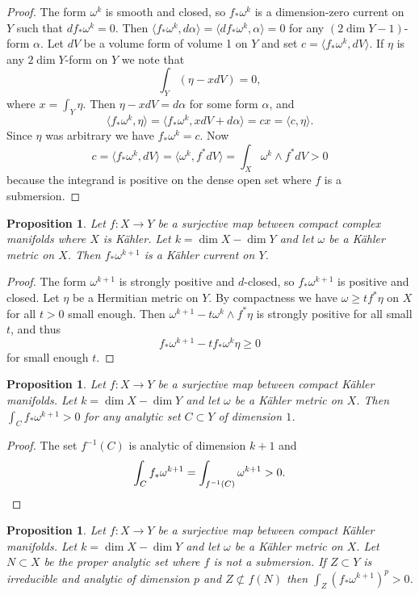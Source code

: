 \documentclass[11pt]{amsart}
\newtheorem{prop}[theo]{Proposition}
\theoremstyle{definition}
\def\<{\langle}
\def\>{\rangle}
\begin{document}
\begin{proof}
The form $\omega^k$ is smooth and closed, so $f_*\omega^k$ is a dimension-zero current on $Y$ such that $d f_*\omega^k = 0$.
Then $\< f_*\omega^k, d\alpha \> = \< df_*\omega^k, \alpha \> = 0$ for any $(2\dim Y-1)$-form $\alpha$.
Let $dV$ be a volume form of volume 1 on $Y$ and set $c = \< f_*\omega^k ,dV\>$.
If $\eta$ is any $2\dim Y$-form on $Y$ we note that
\[
\int_Y (\eta - x dV) = 0,
\]
where $x = \int_Y \eta$.
Then $\eta - x dV = d\alpha$ for some form $\alpha$, and
\[
\< f_*\omega^k, \eta \>
= \< f_*\omega^k, x dV + d\alpha \>
= cx
= \< c, \eta \>.
\]
Since $\eta$ was arbitrary we have $f_*\omega^k = c$.
Now
\[
c = \< f_*\omega^k, dV \>
= \< \omega^k, f^*dV \>
= \int_X \omega^k \wedge f^*dV 
> 0
\]
because the integrand is positive on the dense open set where $f$ is a submersion.
\end{proof}


\begin{prop}
Let $f : X \to Y$ be a surjective map between compact complex manifolds where $X$ is K\"ahler.
Let $k = \dim X - \dim Y$ and let $\omega$ be a K\"ahler metric on $X$.
Then $f_*\omega^{k+1}$ is a K\"ahler current on $Y$.
\end{prop}

\begin{proof}
The form $\omega^{k+1}$ is strongly positive and $d$-closed, so $f_*\omega^{k+1}$ is positive and closed.
Let $\eta$ be a Hermitian metric on $Y$.
By compactness we have $\omega \geq t f^*\eta$ on $X$ for all $t > 0$ small enough.
Then $\omega^{k+1} - t \omega^k \wedge f^*\eta$ is strongly positive for all small $t$, and thus
\[
f_*\omega^{k+1} - t f_*\omega^k \eta \geq 0
\]
for small enough $t$.
\end{proof}



\begin{prop}
Let $f : X \to Y$ be a surjective map between compact K\"ahler manifolds.
Let $k = \dim X - \dim Y$ and let $\omega$ be a K\"ahler metric on $X$.
Then $\int_C f_*\omega^{k+1} > 0$ for any analytic set $C \subset Y$ of dimension $1$.
\end{prop}

\begin{proof}
The set $f^{-1}(C)$ is analytic of dimension $k+1$ and
\[
\int_C f_*\omega^{k+1}
= \int_{f^{-1}(C)} \omega^{k+1} > 0.
\qedhere
\]
\end{proof}

\begin{prop}
Let $f : X \to Y$ be a surjective map between compact K\"ahler manifolds.
Let $k = \dim X - \dim Y$ and let $\omega$ be a K\"ahler metric on $X$.
Let $N \subset X$ be the proper analytic set where $f$ is not a submersion.
If $Z \subset Y$ is irreducible and analytic of dimension $p$ and $Z \not\subset f(N)$ then $\int_Z (f_*\omega^{k+1})^p > 0$.
\end{prop}
\end{document}
